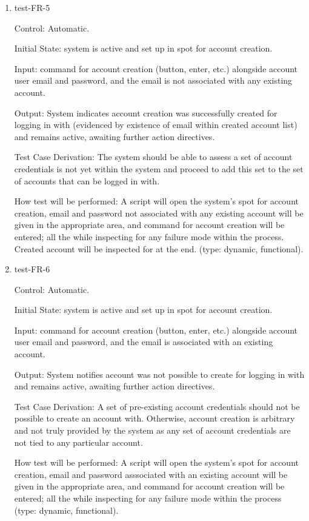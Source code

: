 \documentclass[12pt, titlepage]{article}
\begin{document}
\begin{enumerate}

\item{test-FR-5\\}

Control: Automatic.
					
Initial State: system is active and set up in spot for account creation.
					
Input: command for account creation (button, enter, etc.) alongside account 
user email and password, and the email is not associated with any existing 
account.
					
Output: System indicates account creation was successfully created for 
logging in with (evidenced by existence of email within created account list)
and remains active, awaiting further action directives.

Test Case Derivation: The system should be able to assess a set of account 
credentials is not yet within the system and proceed to add this set to the 
set of accounts that can be logged in with.

How test will be performed: A script will open the system's spot for account creation, 
email and password not associated with any existing account will be given in the 
appropriate area, and command for account creation will be entered; all the while inspecting 
for any failure mode within the process. Created account will be inspected for at the end.
(type: dynamic, functional).

\item{test-FR-6\\}

Control: Automatic.
					
Initial State: system is active and set up in spot for account creation.
					
Input: command for account creation (button, enter, etc.) alongside account 
user email and password, and the email is associated with an existing 
account.
					
Output: System notifies account was not possible to create for logging 
in with and remains active, awaiting further action directives.

Test Case Derivation: A set of pre-existing account credentials should not be 
possible to create an account with. Otherwise, account creation is arbitrary 
and not truly provided by the system as any set of account credentials are not 
tied to any particular account.

How test will be performed: A script will open the system's spot for account 
creation, email and password asssociated with an existing account will be 
given in the appropriate area, and command for account creation will be 
entered; all the while inspecting for any failure mode within the process 
(type: dynamic, functional).
					

\end{enumerate}
\end{document}
